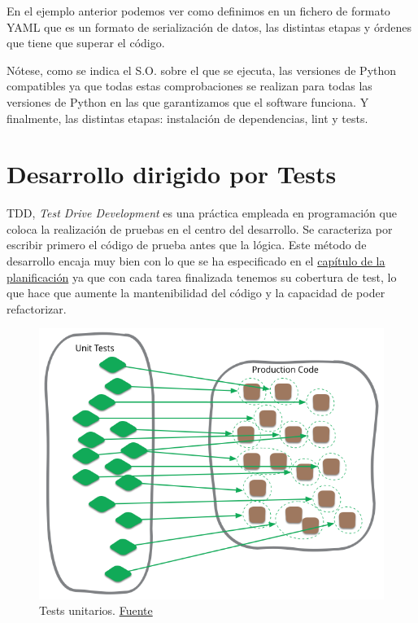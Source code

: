 En el ejemplo anterior podemos ver como definimos en un fichero de formato YAML que es un
formato de serialización de datos, las distintas etapas y órdenes que tiene que superar el
código.

Nótese, como se indica el S.O. sobre el que se ejecuta, las versiones de Python
compatibles ya que todas estas comprobaciones se realizan para todas las versiones de
Python en las que garantizamos que el software funciona. Y finalmente, las distintas
etapas: instalación de dependencias, lint y tests.

\section{Desarrollo dirigido por Tests}
TDD, \textit{Test Drive Development} es una práctica empleada en programación que coloca
la realización de pruebas en el centro del desarrollo. Se caracteriza por escribir primero
el código de prueba antes que la lógica. Este método de desarrollo encaja muy bien con lo
que se ha especificado en el \hyperref[sec:plani]{capítulo de la planificación} ya que con
cada tarea finalizada tenemos su cobertura de test, lo que hace que aumente la
mantenibilidad del código y la capacidad de poder refactorizar.


\FloatBarrier
\begin{figure}[h]
	\centering	
	\includegraphics[width=\textwidth]{doc/logos/imgs/unit-test.png}
    \caption{ Tests unitarios.
    \href{https://martinfowler.com/bliki/images/unitTest/sketch.png}{Fuente}}
    \label{fig:unit-tests}
\end{figure}
\FloatBarrier

